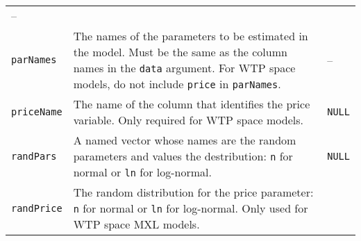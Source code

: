 \documentclass[article]{jss}
\begin{document}
\begin{longtable}[]{@{}lll@{}}
\begin{minipage}[t]{0.11\columnwidth}
--\strut
\end{minipage}\tabularnewline
\begin{minipage}[t]{0.14\columnwidth}\raggedright
\texttt{parNames}\strut
\end{minipage} & \begin{minipage}[t]{0.66\columnwidth}\raggedright
The names of the parameters to be estimated in the model. Must be the
same as the column names in the \texttt{data} argument. For WTP space
models, do not include \texttt{price} in \texttt{parNames}.\strut
\end{minipage} & \begin{minipage}[t]{0.11\columnwidth}\raggedright
--\strut
\end{minipage}\tabularnewline
\begin{minipage}[t]{0.14\columnwidth}\raggedright
\texttt{priceName}\strut
\end{minipage} & \begin{minipage}[t]{0.66\columnwidth}\raggedright
The name of the column that identifies the price variable. Only required
for WTP space models.\strut
\end{minipage} & \begin{minipage}[t]{0.11\columnwidth}\raggedright
\texttt{NULL}\strut
\end{minipage}\tabularnewline
\begin{minipage}[t]{0.14\columnwidth}\raggedright
\texttt{randPars}\strut
\end{minipage} & \begin{minipage}[t]{0.66\columnwidth}\raggedright
A named vector whose names are the random parameters and values the
destribution: \texttt{\textquotesingle{}n\textquotesingle{}} for normal
or \texttt{\textquotesingle{}ln\textquotesingle{}} for log-normal.\strut
\end{minipage} & \begin{minipage}[t]{0.11\columnwidth}\raggedright
\texttt{NULL}\strut
\end{minipage}\tabularnewline
\begin{minipage}[t]{0.14\columnwidth}\raggedright
\texttt{randPrice}\strut
\end{minipage} & \begin{minipage}[t]{0.66\columnwidth}\raggedright
The random distribution for the price parameter:
\texttt{\textquotesingle{}n\textquotesingle{}} for normal or
\texttt{\textquotesingle{}ln\textquotesingle{}} for log-normal. Only
used for WTP space MXL models.\strut
\end{minipage} & \begin{minipage}[t]{0.11\columnwidth}\raggedright

\end{minipage}
\end{longtable}
\end{document}
